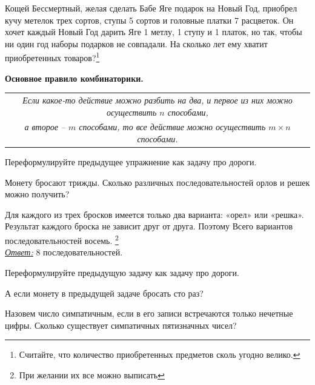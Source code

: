 \begin{ex}\label{u15}
	Кощей Бессмертный, желая сделать Бабе Яге подарок на Новый Год, приобрел кучу метелок трех сортов, ступы 5 сортов и головные платки 7 расцветок. Он хочет каждый Новый Год дарить Яге 1 метлу, 1 ступу и 1 платок, но так, чтобы ни один год наборы подарков не совпадали. На сколько лет ему хватит приобретенных товаров?\footnote{Считайте, что количество приобретенных предметов сколь угодно велико.}
\end{ex}

\begin{table}[h]
	\centering	
	\textbf{Основное правило комбинаторики.}\\
	\begin{tabular}{|c|}
		\hline
		\textit{Если какое-то действие можно разбить на два,} \textit{и первое из них можно осуществить $n$ способами,}\\
		\textit{а второе – $m$ способами, то все действие}
		\textit{ можно осуществить $ m\times n$ способами.}\\
		\hline
	\end{tabular}
\end{table}

\begin{ex}\label{u16}
	Переформулируйте предыдущее упражнение как задачу про дороги. 
\end{ex}

\begin{thm}
	Монету бросают трижды. Сколько различных последовательностей орлов и решек можно получить? 
\end{thm}

\begin{prf}
	Для каждого из трех бросков имеется только два варианта: «орел» или «решка». Результат каждого броска не зависит друг от друга. Поэтому Всего вариантов последовательностей восемь. \footnote{При желании их все можно выписать}\\ \underline{\textit{Ответ:}} 8 последовательностей.
\end{prf}

\begin{ex}\label{u17}
	Переформулируйте предыдущую задачу как задачу про дороги. 
\end{ex}

\begin{ex}\label{u18}
	А если монету в предыдущей задаче бросать сто раз?
\end{ex}

\begin{thm}Назовем число симпатичным, если в его записи встречаются только нечетные цифры. Сколько существует симпатичных пятизначных чисел?
\end{thm}

